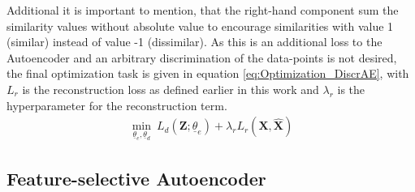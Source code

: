 \documentclass[12pt,DIV14,BCOR12mm,a4paper,footexclude,headinclude,halfparskip-,twoside,openright,cleardoubleempty,idxtotoc,bibtotoc,listtotoc]{scrreprt} %
\numberwithin{equation}{chapter}
\begin{document}
Additional it is important to mention, that the right-hand component sum the similarity values without absolute value to encourage similarities with value 1 (similar) instead of value -1 (dissimilar). As this is an additional loss to the Autoencoder and an arbitrary discrimination of the data-points is not desired, the final optimization task is given in equation \ref{eq:Optimization_DiscrAE}, with $L_r$ is the reconstruction loss as defined earlier in this work and $\lambda_r$ is the hyperparameter for the reconstruction term.
\begin{align}
	 \underset{\underline{\theta}_e, \underline{\theta}_d}\min\ L_d(\mathbf{Z};\underline{\theta}_e)+\lambda_r L_r(\mathbf{X,\hat{\mathbf{X}}})\label{eq:Optimization_DiscrAE}
\end{align}
\subsection{Feature-selective Autoencoder}
\end{document}

